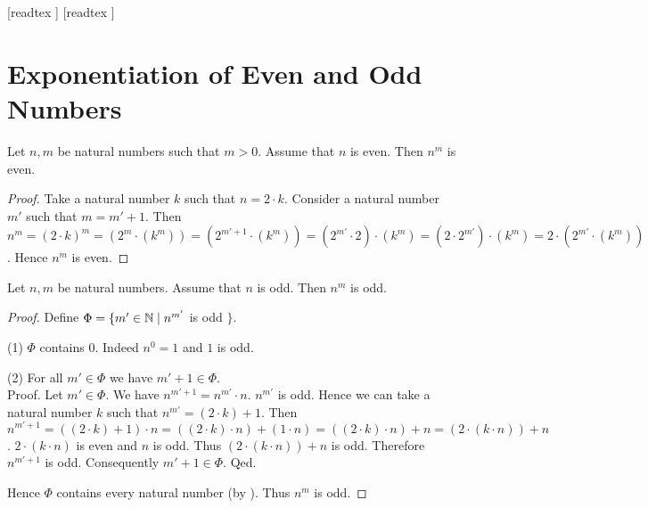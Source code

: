\documentclass[10pt]{article}
\begin{document}
  \begin{imports}
    \begin{forthel}
      [readtex ]
      [readtex ]
    \end{forthel}
  \end{imports}


  \section*{Exponentiation of Even and Odd Numbers}

  \begin{forthel}
    \begin{proposition}[id=ARITHMETIC_15_1023659658745214,printid]
      Let $n, m$ be natural numbers such that $m > 0$.
      Assume that $n$ is even.
      Then $n^{m}$ is even.
    \end{proposition}
    \begin{proof}
      Take a natural number $k$ such that $n = 2 \cdot k$.
      Consider a natural number $m'$ such that $m = m' + 1$.
      Then $n^{m}
        = (2 \cdot k)^{m}
        = (2^{m} \cdot (k^{m}))
        = (2^{m' + 1} \cdot (k^{m}))
        = (2^{m'} \cdot 2) \cdot (k^{m})
        = (2 \cdot 2^{m'}) \cdot (k^{m})
        = 2 \cdot (2^{m'} \cdot (k^{m}))$.
      Hence $n^{m}$ is even.
    \end{proof}
  \end{forthel}

  \begin{forthel}
    \begin{proposition}[id=ARITHMETIC_15_0021200236556985,printid]
      Let $n, m$ be natural numbers.
      Assume that $n$ is odd.
      Then $n^{m}$ is odd.
    \end{proposition}
    \begin{proof}
      Define $\Phi = \{ m' \in \mathbb{N} \mid n^{m'}$ is odd $\}$.

      (1) $\Phi$ contains $0$.
      Indeed $n^{0} = 1$ and $1$ is odd.

      (2) For all $m' \in \Phi$ we have $m' + 1 \in \Phi$. \\
      Proof.
        Let $m' \in \Phi$.
        We have $n^{m' + 1} = n^{m'} \cdot n$.
        $n^{m'}$ is odd.
        Hence we can take a natural number $k$ such that $n^{m'} = (2 \cdot k) + 1$.
        Then $n^{m' + 1}
          = ((2 \cdot k) + 1) \cdot n
          = ((2 \cdot k) \cdot n) + (1 \cdot n)
          = ((2 \cdot k) \cdot n) + n
          = (2 \cdot (k \cdot n)) + n$.
        $2 \cdot (k \cdot n)$ is even and $n$ is odd.
        Thus $(2 \cdot (k \cdot n)) + n$ is odd.
        Therefore $n^{m' + 1}$ is odd.
        Consequently $m' + 1 \in \Phi$.
      Qed.

      Hence $\Phi$ contains every natural number (by ).
      Thus $n^{m}$ is odd.
    \end{proof}
  \end{forthel}
\end{document}
